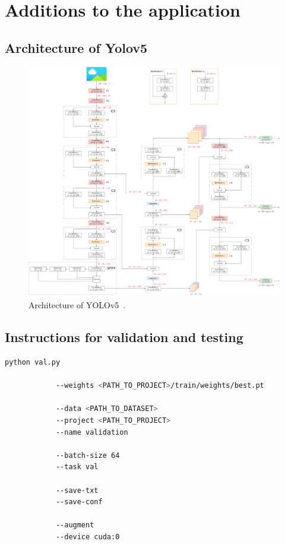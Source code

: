 \chapter{Additions to the application}\label{chpt:applicationAdditions}
\glsresetall

\section{Architecture of Yolov5}\label{sec:aa:archyolov5}

\begin{figure}[H]
	\centering
	\includegraphics[width=1.0\linewidth]{images/a01-arch-yolov5}
	\caption[Architecture of YOLOv5.]{Architecture of YOLOv5~\cite{archYolov5}.}
	\label{fig:aa:archyolov5}
\end{figure}

\section{Instructions for validation and testing}

\begin{minipage}{\linewidth}
	\begin{lstlisting}[language=Bash, keywordstyle=\color{black}, 
		caption=General command to run the validation task of YOLOv5., label=lst:aa:valcmd]
		python val.py
			
			--weights <PATH_TO_PROJECT>/train/weights/best.pt
			
			--data <PATH_TO_DATASET>
			--project <PATH_TO_PROJECT>
			--name validation
			
			--batch-size 64
			--task val
			
			--save-txt
			--save-conf
			
			--augment
			--device cuda:0
	\end{lstlisting}
\end{minipage}

